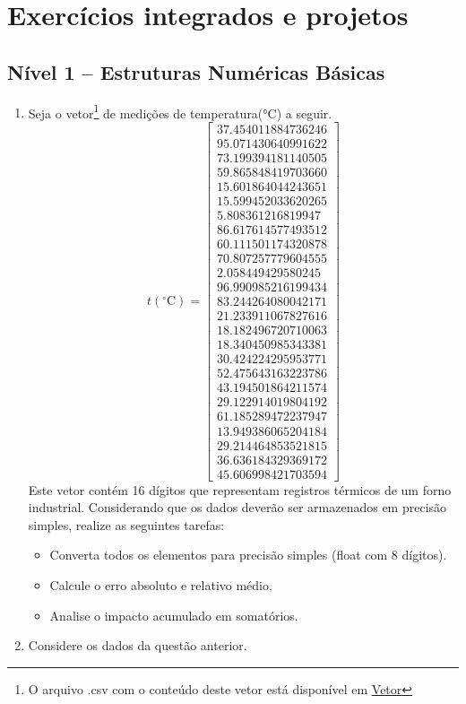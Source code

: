 \section{Exercícios integrados e projetos} \label{sec:ExercicioIntetradosProjetos}


\subsection*{Nível 1 -- Estruturas Numéricas Básicas}

\begin{enumerate}[label=\thesection.\arabic*]

\item Seja o vetor\footnote{O arquivo .csv com o conteúdo deste vetor está disponível 
em \href{https://github.com/JonathaCosta-IA/NM/blob/main/B-NM_codes/SolListaExerciciosPropostos/z_AplicMN_eng/dados_temp.csv}{Vetor}} de medições de temperatura(°C) a seguir.
\[
t(^{\circ}\mathrm{C}) = \begin{bmatrix}
	37.454011884736246 \\
	95.071430640991622 \\
	73.199394181140505 \\
	59.865848419703660 \\
	15.601864044243651 \\
	15.599452033620265 \\
	5.808361216819947 \\
	86.617614577493512 \\
	60.111501174320878 \\
	70.807257779604555 \\
	2.058449429580245 \\
	96.990985216199434 \\
	83.244264080042171 \\
	21.233911067827616 \\
	18.182496720710063 \\
	18.340450985343381 \\
	30.424224295953771 \\
	52.475643163223786 \\
	43.194501864211574 \\
	29.122914019804192 \\
	61.185289472237947 \\
	13.949386065204184 \\
	29.214464853521815 \\
	36.636184329369172 \\
	45.606998421703594
\end{bmatrix}
\]
Este vetor contém 16 dígitos que representam registros térmicos de um forno industrial. 
Considerando que os dados deverão ser armazenados em precisão simples, realize as seguintes tarefas:
	\begin{itemize}
	\item Converta todos os elementos para precisão simples (float com 8 dígitos).
	\item Calcule o erro absoluto e relativo médio.
	\item Analise o impacto acumulado em somatórios.
	\end{itemize}
\item Considere os dados da questão anterior.


\end{enumerate}
